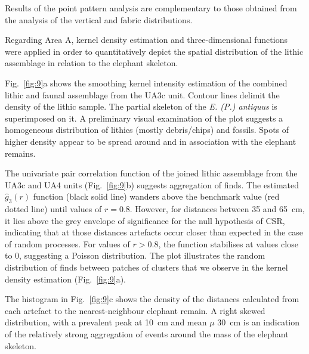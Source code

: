 \documentclass[preprint,authoryear,times]{elsarticle} %
\begin{document}
Results of the point pattern analysis are complementary to those obtained from the analysis of the vertical and fabric distributions.  


Regarding Area A, kernel density estimation and three-dimensional functions were applied in order to quantitatively depict the spatial distribution of the lithic assemblage in relation to the elephant skeleton.

Fig.~\ref{fig:9}a shows the smoothing kernel intensity estimation of the combined lithic and faunal assemblage from the UA3c unit. Contour lines delimit the density of the lithic sample. The partial skeleton of the \emph{E. (P.) antiquus} is superimposed on it. A preliminary visual examination of the plot suggests a homogeneous distribution of lithics (mostly debris/chips) and fossils. Spots of higher density appear to be spread around and in association with the elephant remains.

The univariate pair correlation function of the joined lithic assemblage from the UA3c and UA4 units (Fig.~\ref{fig:9}b) suggests aggregation of finds. The estimated $\hat{g}_3(r)$ function (black solid line) wanders above the benchmark value (red dotted line) until values of $r=0.8$. However, for distances between 35 and 65~cm, it lies above the grey envelope of significance for the null hypothesis of CSR, indicating that at those distances artefacts occur closer than expected in the case of random processes. For values of $r>0.8$, the function stabilises at values close to 0, suggesting a Poisson distribution. The plot illustrates the random distribution of finds between patches of clusters that we observe in the kernel density estimation (Fig.~\ref{fig:9}a).

The histogram in Fig.~\ref{fig:9}c shows the density of the distances calculated from each artefact to the nearest-neighbour elephant remain. A right skewed distribution, with a prevalent peak at 10~cm and mean $\mu$ 30~cm is an indication of the relatively strong aggregation of events around the mass of the elephant skeleton.
\end{document}

